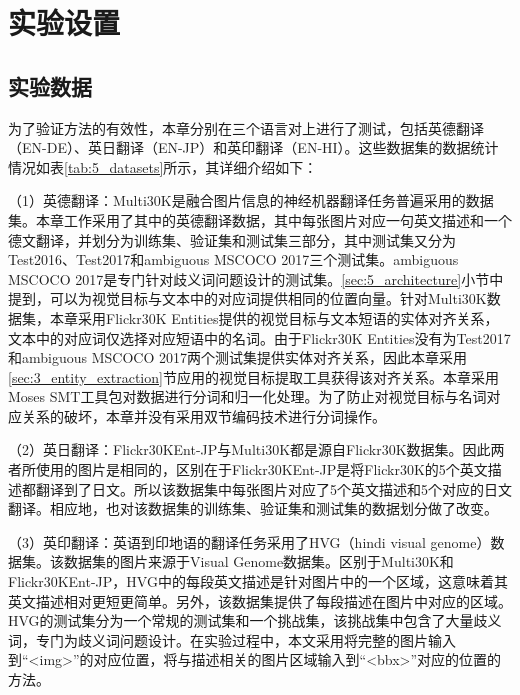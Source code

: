 \section{实验设置}
\label{sec:5_setup}

\subsection{实验数据}
\label{sec:5_datasets}

为了验证方法的有效性，本章分别在三个语言对上进行了测试，包括英德翻译（EN-DE）、英日翻译（EN-JP）和英印翻译（EN-HI）。这些数据集的数据统计情况如表\ref{tab:5_datasets}所示，其详细介绍如下：

（1）{\sffamily 英德翻译：}Multi30K是融合图片信息的神经机器翻译任务普遍采用的数据集。本章工作采用了其中的英德翻译数据，其中每张图片对应一句英文描述和一个德文翻译，并划分为训练集、验证集和测试集三部分，其中测试集又分为Test2016、Test2017和ambiguous MSCOCO 2017三个测试集。ambiguous MSCOCO 2017是专门针对歧义词问题设计的测试集。\ref{sec:5_architecture}小节中提到，可以为视觉目标与文本中的对应词提供相同的位置向量。针对Multi30K数据集，本章采用Flickr30K Entities提供的视觉目标与文本短语的实体对齐关系，文本中的对应词仅选择对应短语中的名词。由于Flickr30K Entities没有为Test2017和ambiguous MSCOCO 2017两个测试集提供实体对齐关系，因此本章采用\ref{sec:3_entity_extraction}节应用的视觉目标提取工具获得该对齐关系。本章采用Moses SMT工具包对数据进行分词和归一化处理。为了防止对视觉目标与名词对应关系的破坏，本章并没有采用双节编码技术进行分词操作。

（2）{\sffamily 英日翻译：}Flickr30KEnt-JP与Multi30K都是源自Flickr30K数据集。因此两者所使用的图片是相同的，区别在于Flickr30KEnt-JP是将Flickr30K的5个英文描述都翻译到了日文。所以该数据集中每张图片对应了5个英文描述和5个对应的日文翻译。相应地，也对该数据集的训练集、验证集和测试集的数据划分做了改变。

（3）{\sffamily 英印翻译：}英语到印地语的翻译任务采用了HVG（hindi visual genome）数据集。该数据集的图片来源于Visual Genome数据集。区别于Multi30K和Flickr30KEnt-JP，HVG中的每段英文描述是针对图片中的一个区域，这意味着其英文描述相对更短更简单。另外，该数据集提供了每段描述在图片中对应的区域。HVG的测试集分为一个常规的测试集和一个挑战集，该挑战集中包含了大量歧义词，专门为歧义词问题设计。在实验过程中，本文采用将完整的图片输入到“<img>”的对应位置，将与描述相关的图片区域输入到“<bbx>”对应的位置的方法。

